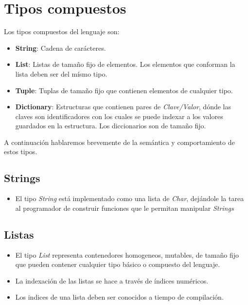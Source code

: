 \documentclass[12pt, spanish]{report}
\begin{document}
\section{Tipos compuestos}
\label{sec:tiposcompuestos}

Los tipos compuestos del lenguaje son:

\begin{itemize}
\item \textbf{String}: Cadena de car\'acteres.
\item \textbf{List}: Listas de tama\~no fijo de elementos. Los
  elementos que conforman la lista deben ser del m\'ismo tipo.
\item \textbf{Tuple}: Tuplas de tama\~no fijo que contienen elementos de
  cualquier tipo.
\item \textbf{Dictionary}: Estructuras que contienen pares de
  \emph{Clave/Valor}, d\'onde las claves son identificadores con los
  cuales se puede indexar a los valores guardados en la
  estructura. Los diccionarios son de tamaño fijo.
\end{itemize}

A continuaci\'on hablaremos brevemente de la sem\'antica y
comportamiento de estos tipos.

\subsection{Strings}
\label{sec:strings}
\begin{itemize}
\item El tipo \emph{String} est\'a implementado como una lista de
  \emph{Char}, dej\'andole la tarea al programador de construir
  funciones que le permitan manipular \emph{Strings}
\end{itemize}

\subsection{Listas}
\label{sec:lists}
\begin{itemize}
\item El tipo \emph{List} representa contenedores homogeneos,
  mutables, de tama\~no fijo que pueden contener cualquier tipo
  b\'asico o compuesto del lenguaje.
\item La indexaci\'on de las listas se hace a trav\'es de \'indices
  num\'ericos.
\item Los indices de una lista deben ser conocidos a tiempo de
  compilaci\'on.
\end{itemize}
\end{document}
